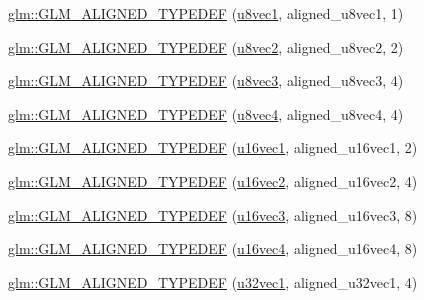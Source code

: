 \begin{DoxyCompactItemize}
\item 
\mbox{\hyperlink{group__gtx__type__aligned_ga5611d6718e3a00096918a64192e73a45}{glm\+::\+G\+L\+M\+\_\+\+A\+L\+I\+G\+N\+E\+D\+\_\+\+T\+Y\+P\+E\+D\+EF}} (\mbox{\hyperlink{group__gtc__type__precision_ga024be724ff45865952190522b03fc0d5}{u8vec1}}, aligned\+\_\+u8vec1, 1)
\item 
\mbox{\hyperlink{group__gtx__type__aligned_ga19837e6f72b60d994a805ef564c6c326}{glm\+::\+G\+L\+M\+\_\+\+A\+L\+I\+G\+N\+E\+D\+\_\+\+T\+Y\+P\+E\+D\+EF}} (\mbox{\hyperlink{group__gtc__type__precision_ga1c259b876f8757eb197b83a5fab476f0}{u8vec2}}, aligned\+\_\+u8vec2, 2)
\item 
\mbox{\hyperlink{group__gtx__type__aligned_ga9740cf8e34f068049b42a2753f9601c2}{glm\+::\+G\+L\+M\+\_\+\+A\+L\+I\+G\+N\+E\+D\+\_\+\+T\+Y\+P\+E\+D\+EF}} (\mbox{\hyperlink{group__gtc__type__precision_ga8262aeb120701de1b57773eb10be0f35}{u8vec3}}, aligned\+\_\+u8vec3, 4)
\item 
\mbox{\hyperlink{group__gtx__type__aligned_ga8b8588bb221448f5541a858903822a57}{glm\+::\+G\+L\+M\+\_\+\+A\+L\+I\+G\+N\+E\+D\+\_\+\+T\+Y\+P\+E\+D\+EF}} (\mbox{\hyperlink{group__gtc__type__precision_gaf3c840b8a90a194559121504ba599197}{u8vec4}}, aligned\+\_\+u8vec4, 4)
\item 
\mbox{\hyperlink{group__gtx__type__aligned_ga991abe990c16de26b2129d6bc2f4c051}{glm\+::\+G\+L\+M\+\_\+\+A\+L\+I\+G\+N\+E\+D\+\_\+\+T\+Y\+P\+E\+D\+EF}} (\mbox{\hyperlink{group__gtc__type__precision_ga809cb55e5fed3456686aae96e7e8684c}{u16vec1}}, aligned\+\_\+u16vec1, 2)
\item 
\mbox{\hyperlink{group__gtx__type__aligned_gac01bb9fc32a1cd76c2b80d030f71df4c}{glm\+::\+G\+L\+M\+\_\+\+A\+L\+I\+G\+N\+E\+D\+\_\+\+T\+Y\+P\+E\+D\+EF}} (\mbox{\hyperlink{group__gtc__type__precision_ga10e8900b9610f930772aa55aee8e3121}{u16vec2}}, aligned\+\_\+u16vec2, 4)
\item 
\mbox{\hyperlink{group__gtx__type__aligned_ga09540dbca093793a36a8997e0d4bee77}{glm\+::\+G\+L\+M\+\_\+\+A\+L\+I\+G\+N\+E\+D\+\_\+\+T\+Y\+P\+E\+D\+EF}} (\mbox{\hyperlink{group__gtc__type__precision_ga947d0d003e016eaf2038d6843b427257}{u16vec3}}, aligned\+\_\+u16vec3, 8)
\item 
\mbox{\hyperlink{group__gtx__type__aligned_gaecafb5996f5a44f57e34d29c8670741e}{glm\+::\+G\+L\+M\+\_\+\+A\+L\+I\+G\+N\+E\+D\+\_\+\+T\+Y\+P\+E\+D\+EF}} (\mbox{\hyperlink{group__gtc__type__precision_ga87d1f39c523b4d6d4de0c2778afe5474}{u16vec4}}, aligned\+\_\+u16vec4, 8)
\item 
\mbox{\hyperlink{group__gtx__type__aligned_gac6b161a04d2f8408fe1c9d857e8daac0}{glm\+::\+G\+L\+M\+\_\+\+A\+L\+I\+G\+N\+E\+D\+\_\+\+T\+Y\+P\+E\+D\+EF}} (\mbox{\hyperlink{group__gtc__type__precision_ga09dd72852808c32ba398674736b9672a}{u32vec1}}, aligned\+\_\+u32vec1, 4)

\end{DoxyCompactItemize}
